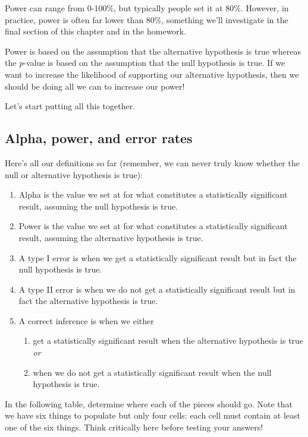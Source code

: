 \documentclass[
]{book}
\begin{document}
Power can range from 0-100\%, but typically people set it at 80\%. However, in practice, power is often far lower than 80\%, something we'll investigate in the final section of this chapter and in the homework.

Power is based on the assumption that the alternative hypothesis is true whereas the \emph{p}-value is based on the assumption that the null hypothesis is true. If we want to increase the likelihood of supporting our alternative hypothesis, then we should be doing all we can to increase our power!

Let's start putting all this together.

\hypertarget{alpha-power-and-error-rates}{%
\subsection{Alpha, power, and error rates}\label{alpha-power-and-error-rates}}

Here's all our definitions so far (remember, we can never truly know whether the null or alternative hypothesis is true):

\begin{enumerate}
\def\labelenumi{\arabic{enumi}.}
\item
  Alpha is the value we set at for what constitutes a statistically significant result, assuming the null hypothesis is true.
\item
  Power is the value we set at for what constitutes a statistically significant result, assuming the alternative hypothesis is true.
\item
  A type I error is when we get a statistically significant result but in fact the null hypothesis is true.
\item
  A type II error is when we do not get a statistically significant result but in fact the alternative hypothesis is true.
\item
  A correct inference is when we either

  \begin{enumerate}
  \def\labelenumii{\arabic{enumii}.}
  \item
    get a statistically significant result when the alternative hypothesis is true \emph{or}
  \item
    when we do not get a statistically significant result when the null hypothesis is true.
  \end{enumerate}
\end{enumerate}

In the following table, determine where each of the pieces should go. Note that we have six things to populate but only four cells: each cell must contain at least one of the six things. Think critically here before testing your answers!
\end{document}
